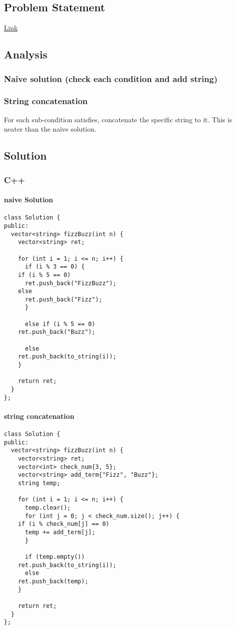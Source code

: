 \documentclass[11pt]{article}
\begin{document}
\subsection{Problem Statement}
\label{sec:orgf563b07}
\href{https://leetcode.com/problems/fizz-buzz/}{Link}
\subsection{Analysis}
\label{sec:org18f5676}
\subsubsection{Naive solution (check each condition and add string)}
\label{sec:orgc6b2d60}
\subsubsection{String concatenation}
\label{sec:orgdcda39d}
For each sub-condition satisfies, concatenate the specific string to it. This is neater than the naive solution.
\subsection{Solution}
\label{sec:org4d0714e}
\subsubsection{C++}
\label{sec:orgc8d914a}
\paragraph{naive Solution}
\label{sec:org98c8862}
\begin{verbatim}
class Solution {
public:
  vector<string> fizzBuzz(int n) {
    vector<string> ret;

    for (int i = 1; i <= n; i++) {
      if (i % 3 == 0) {
	if (i % 5 == 0)
	  ret.push_back("FizzBuzz");
	else
	  ret.push_back("Fizz");
      }

      else if (i % 5 == 0)
	ret.push_back("Buzz");

      else
	ret.push_back(to_string(i));
    }

    return ret;
  }
};
\end{verbatim}
\paragraph{string concatenation}
\label{sec:orga7c1681}
\begin{verbatim}
class Solution {
public:
  vector<string> fizzBuzz(int n) {
    vector<string> ret;
    vector<int> check_num{3, 5};
    vector<string> add_term{"Fizz", "Buzz"};
    string temp;

    for (int i = 1; i <= n; i++) {
      temp.clear();
      for (int j = 0; j < check_num.size(); j++) {
	if (i % check_num[j] == 0)
	  temp += add_term[j];
      }

      if (temp.empty())
	ret.push_back(to_string(i));
      else
	ret.push_back(temp);
    }

    return ret;
  }
};
\end{verbatim}
\end{document}
